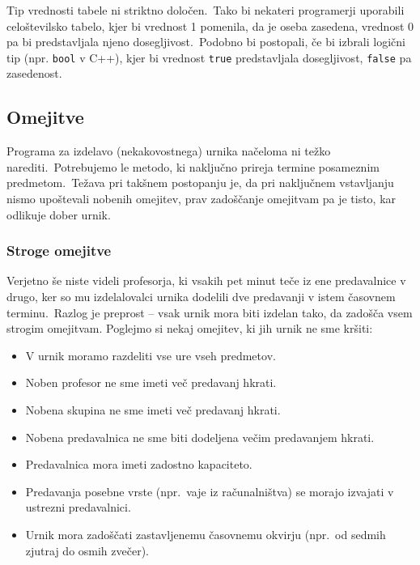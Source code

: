 \documentclass[a4paper,10pt]{article}
\begin{document}
Tip vrednosti tabele ni striktno določen.\ Tako bi nekateri programerji uporabili
celoštevilsko tabelo, kjer bi vrednost 1 pomenila, da je oseba zasedena, vrednost 0
pa bi predstavljala njeno dosegljivost.\ Podobno bi postopali, če bi izbrali logični
tip (npr. \texttt{bool} v C++), kjer bi vrednost \texttt{true} predstavljala
dosegljivost, \texttt{false} pa zasedenost.

\subsection{Omejitve}

Programa za izdelavo (nekakovostnega) urnika načeloma ni težko narediti.\ Potrebujemo
le metodo, ki naključno prireja termine posameznim predmetom.\ Težava pri takšnem postopanju
je, da pri naključnem vstavljanju nismo upoštevali nobenih omejitev, prav zadoščanje omejitvam
pa je tisto, kar odlikuje dober urnik.

\subsubsection{Stroge omejitve}

Verjetno še niste videli profesorja, ki vsakih pet minut teče iz ene predavalnice v drugo,
ker so mu izdelalovalci urnika dodelili dve predavanji v istem časovnem terminu.\ Razlog
je preprost -- vsak urnik mora biti izdelan tako, da zadošča vsem strogim omejitvam.
Poglejmo si nekaj omejitev, ki jih urnik ne sme kršiti:

  \begin{itemize}
   \item V urnik moramo razdeliti vse ure vseh predmetov.
   \item Noben profesor ne sme imeti več predavanj hkrati.
   \item Nobena skupina ne sme imeti več predavanj hkrati.
   \item Nobena predavalnica ne sme biti dodeljena večim predavanjem hkrati.
   \item Predavalnica mora imeti zadostno kapaciteto.
   \item Predavanja posebne vrste (npr.\ vaje iz računalništva) se morajo izvajati v ustrezni predavalnici.
   \item Urnik mora zadoščati zastavljenemu časovnemu okvirju (npr.\ od sedmih zjutraj do osmih zvečer).
\end{itemize}
\end{document}
